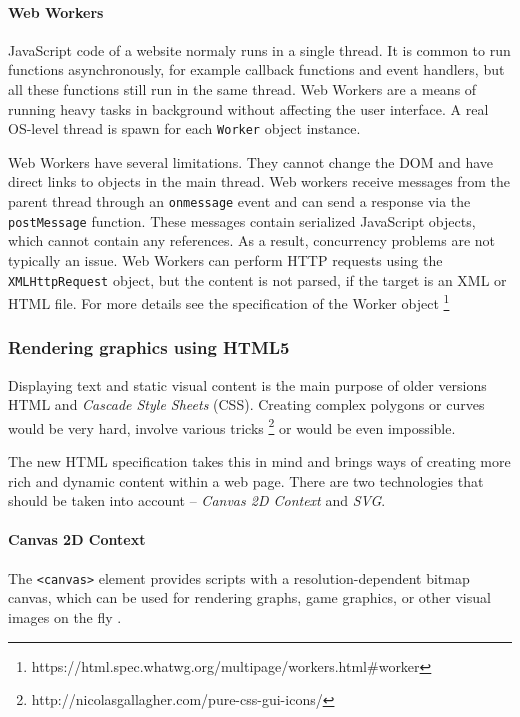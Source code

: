 \paragraph{Web Workers}
JavaScript code of a website normaly runs in a single thread. It is common to run functions asynchronously, for example callback functions and event handlers, but all these functions still run in the same thread. Web Workers are a means of running heavy tasks in background without affecting the user interface. A real OS-level thread is spawn for each \verb|Worker| object instance.

Web Workers have several limitations. They cannot change the DOM and have direct links to objects in the main thread. Web workers receive messages from the parent thread through an \verb|onmessage| event and can send a response via the \verb|postMessage| function. These messages contain serialized JavaScript objects, which cannot contain any references. As a result, concurrency problems are not typically an issue. Web Workers can perform HTTP requests using the \verb|XMLHttpRequest| object, but the content is not parsed, if the target is an XML or HTML file. For more details see the specification of the Worker object\cite{} \footnote{https://html.spec.whatwg.org/multipage/workers.html\#worker}





\subsubsection{Rendering graphics using HTML5}

Displaying text and static visual content is the main purpose of older versions HTML and \textit{Cascade Style Sheets} (CSS). Creating complex polygons or curves would be very hard, involve various tricks \footnote{http://nicolasgallagher.com/pure-css-gui-icons/} or would be even impossible. 

The new HTML specification takes this in mind and brings ways of creating more rich and dynamic content within a web page. There are two technologies that should be taken into account -- \textit{Canvas 2D Context} and \textit{SVG}.

\paragraph{Canvas 2D Context}
The \verb|<canvas>| element provides scripts with a resolution-dependent bitmap canvas, which can be used for rendering graphs, game graphics, or other visual images on the fly \cite{html5_canvas}. 

